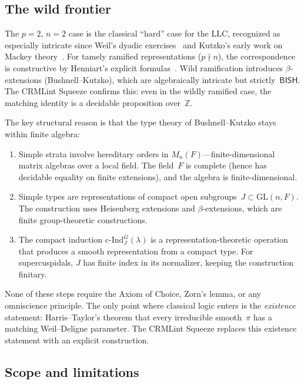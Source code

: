 \documentclass[11pt]{article}
\theoremstyle{plain}
\theoremstyle{definition}
\theoremstyle{remark}
\newcommand{\Z}{\mathbb{Z}}
\newcommand{\GL}{\mathrm{GL}}
\newcommand{\cInd}{\mathrm{c\text{-}Ind}}
\newcommand{\BISH}{\mathsf{BISH}}
\begin{document}
\subsection{The wild frontier}

The $p = 2$, $n = 2$ case is the classical ``hard'' case for
the LLC, recognized as especially intricate since
Weil's dyadic exercises~\cite{Weil1974} and Kutzko's early
work on Mackey theory~\cite{Kutzko1977}.
For tamely ramified representations ($p \nmid n$),
the correspondence is constructive by Henniart's explicit
formulas~\cite{Henniart1993}.  Wild ramification introduces
$\beta$-extensions (Bushnell--Kutzko), which are algebraically
intricate but strictly~$\BISH$.  The CRMLint Squeeze confirms
this: even in the wildly ramified case, the matching identity
is a decidable proposition over~$\Z$.

The key structural reason is that the type theory of
Bushnell--Kutzko stays within finite algebra:
\begin{enumerate}[nosep]
\item Simple strata involve hereditary orders in
  $M_n(F)$---finite-dimensional matrix algebras over a
  local field.  The field~$F$ is complete (hence has
  decidable equality on finite extensions), and the algebra
  is finite-dimensional.
\item Simple types are representations of compact open
  subgroups~$J \subset \GL(n, F)$.  The construction uses
  Heisenberg extensions and $\beta$-extensions, which are
  finite group-theoretic constructions.
\item The compact induction $\cInd_J^G(\lambda)$ is a
  representation-theoretic operation that produces a smooth
  representation from a compact type.  For supercuspidals,
  $J$ has finite index in its normalizer, keeping the
  construction finitary.
\end{enumerate}

None of these steps require the Axiom of Choice, Zorn's
lemma, or any omniscience principle.  The only point where
classical logic enters is the \emph{existence} statement:
Harris--Taylor's theorem that every irreducible smooth~$\pi$
has a matching Weil--Deligne parameter.  The CRMLint Squeeze
replaces this existence statement with an explicit construction.

\subsection{Scope and limitations}
\end{document}
